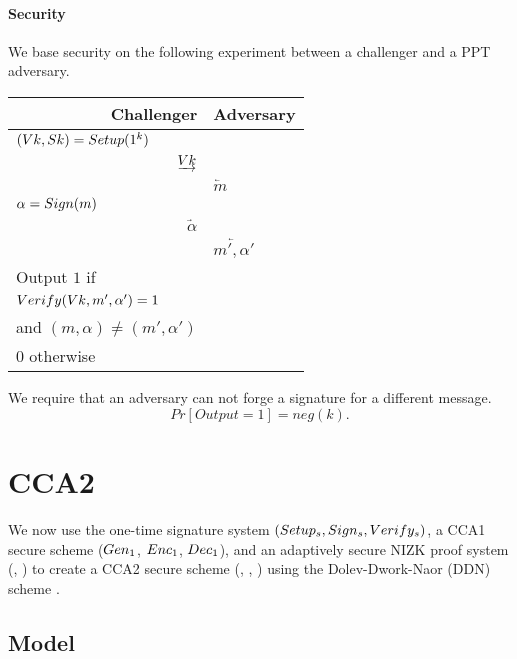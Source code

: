\paragraph{Security}

We base security on the following experiment between a challenger and a PPT adversary.


\begin{center}
\begin{tabular}{rl}
    \multicolumn{1}{r}{Challenger}   &  Adversary  \\ \hline
   \multicolumn{1}{l}{$(Vk, Sk) = Setup(1^k)$}   &    \\
   $ \underrightarrow{\ensuremath{Vk}}$ &   \\
  &  $ \underleftarrow{ m}$   \\
   \multicolumn{1}{l}{$\alpha = Sign(m)$}   &    \\
   $\underrightarrow{\alpha}$ &  \\
    &$\underleftarrow{m', \alpha'}$  \\
   \multicolumn{1}{l}{Output $1$ if }   &    \\
   \multicolumn{1}{l}{$Verify(Vk, m',\alpha') = 1$}   &    \\
   \multicolumn{1}{l}{and $(m, \alpha) \neq (m', \alpha')$}   &    \\
   \multicolumn{1}{l}{$0$ otherwise} &  \\
\end{tabular}
\end{center}
\label{default}

We require that an adversary can not forge a signature for a different message.
\[
Pr [Output = 1]  = neg(k).
\]


\section{CCA2}

We now use the one-time signature system $(Setup_s, Sign_s, Verify_s)$,
a CCA1 secure scheme ($Gen_1$, $Enc_1$, $Dec_1$),
and an adaptively secure NIZK proof system (\cP, \cV)
to create a CCA2 secure scheme (\Setup, \Enc, \Dec)
using the Dolev-Dwork-Naor (DDN) scheme \cite{dolev}.

\subsection{Model}
%
